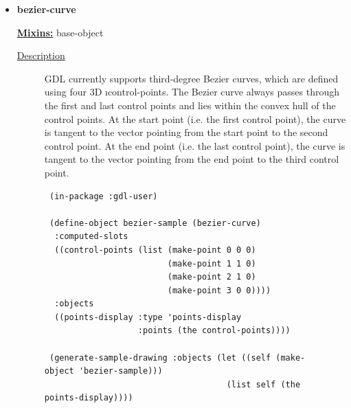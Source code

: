 \documentclass [11pt]{book}
\begin{document}
\begin{itemize}
\begin{description}
\end{description}







\item {}
\label{prim:bezier-curve}
\textbf{bezier-curve}


\textbf{
\underline{Mixins:}} base-object





\begin{description}

\item [
\underline{Description}]


GDL currently supports third-degree Bezier curves, which are 
defined using four 3D 
\i{control-points}. The Bezier curve always passes 
through the first and last control points and lies within the convex hull of the control 
points. At the start point (i.e. the first control point), the curve is tangent 
to the vector pointing from the start point to the second control point. 
At the end point (i.e. the last control point), the curve is tangent to the 
vector pointing from the end point to the third control point.



\end{description}




\begin{figure}
\begin{lrbox}{\boxedverb}
\begin{minipage}{\linewidth}
{\small

\begin{verbatim}
 (in-package :gdl-user)

 (define-object bezier-sample (bezier-curve)
  :computed-slots
  ((control-points (list (make-point 0 0 0)
                         (make-point 1 1 0)
                         (make-point 2 1 0)
                         (make-point 3 0 0))))
  :objects
  ((points-display :type 'points-display
                   :points (the control-points))))

 (generate-sample-drawing :objects (let ((self (make-object 'bezier-sample)))
                                     (list self (the points-display))))

\end{verbatim}}
\end{minipage}
\end{lrbox}
\fbox{\usebox{\boxedverb}}


\end{figure}
\end{itemize}
\end{document}
